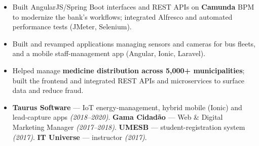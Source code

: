 \documentclass[10pt,a4paper]{altacv}
\begin{document}
\begin{itemize}
\item Built AngularJS/Spring Boot interfaces and REST APIs on \textbf{Camunda} BPM to modernize the bank's workflows; integrated Alfresco and automated performance tests (JMeter, Selenium).
\end{itemize}
\divider

\begin{itemize}
\item Built and revamped applications managing sensors and cameras for bus fleets, and a mobile staff-management app (Angular, Ionic, Laravel).
\end{itemize}
\divider

\begin{itemize}
\item Helped manage \textbf{medicine distribution across 5,000+ municipalities}; built the frontend and integrated REST APIs and microservices to surface data and reduce fraud.
\end{itemize}

\begin{itemize}
\item \textbf{Taurus Software} — IoT energy-management, hybrid mobile (Ionic) and lead-capture apps \emph{(2018--2020)}. \quad \textbf{Gama Cidadão} — Web \& Digital Marketing Manager \emph{(2017--2018)}. \quad \textbf{UMESB} — student-registration system \emph{(2017)}. \quad \textbf{IT Universe} — instructor \emph{(2017)}.
\end{itemize}
\end{document}
